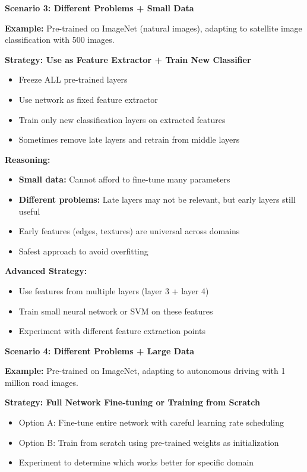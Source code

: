 \documentclass[12pt]{article}
\newcommand{\explanation}[1]{{\color{explanationcolor}#1}}
\begin{document}
\begin{enumerate}[(a)]
{    \textbf{Scenario 3: Different Problems + Small Data}
    
    \explanation{
    \textbf{Example:} Pre-trained on ImageNet (natural images), adapting to satellite image classification with 500 images.
    
    \textbf{Strategy: Use as Feature Extractor + Train New Classifier}
    \begin{itemize}
        \item Freeze ALL pre-trained layers
        \item Use network as fixed feature extractor
        \item Train only new classification layers on extracted features
        \item Sometimes remove late layers and retrain from middle layers
    \end{itemize}
    
    \textbf{Reasoning:}
    \begin{itemize}
        \item \textbf{Small data:} Cannot afford to fine-tune many parameters
        \item \textbf{Different problems:} Late layers may not be relevant, but early layers still useful
        \item Early features (edges, textures) are universal across domains
        \item Safest approach to avoid overfitting
    \end{itemize}
    
    \textbf{Advanced Strategy:}
    \begin{itemize}
        \item Use features from multiple layers (layer 3 + layer 4)
        \item Train small neural network or SVM on these features
        \item Experiment with different feature extraction points
    \end{itemize}
    }
    
    \textbf{Scenario 4: Different Problems + Large Data}
    
    \explanation{
    \textbf{Example:} Pre-trained on ImageNet, adapting to autonomous driving with 1 million road images.
    
    \textbf{Strategy: Full Network Fine-tuning or Training from Scratch}
    \begin{itemize}
        \item Option A: Fine-tune entire network with careful learning rate scheduling
        \item Option B: Train from scratch using pre-trained weights as initialization
        \item Experiment to determine which works better for specific domain
    \end{itemize}
    
}}
\end{enumerate}
\end{document}
